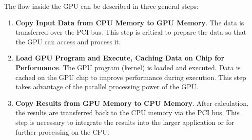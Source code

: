 \highspace
The flow inside the GPU can be described in three general steps:
\begin{enumerate}
    \item \textbf{Copy Input Data from CPU Memory to GPU Memory}. The data is transferred over the PCI bus. This step is critical to prepare the data so that the GPU can access and process it.

    \item \textbf{Load GPU Program and Execute, Caching Data on Chip for Performance}. The GPU program (kernel) is loaded and executed. Data is cached on the GPU chip to improve performance during execution. This step takes advantage of the parallel processing power of the GPU.
    
    \item \textbf{Copy Results from GPU Memory to CPU Memory}. After calculation, the results are transferred back to the CPU memory via the PCI bus. This step is necessary to integrate the results into the larger application or for further processing on the CPU.
\end{enumerate}

\newpage

